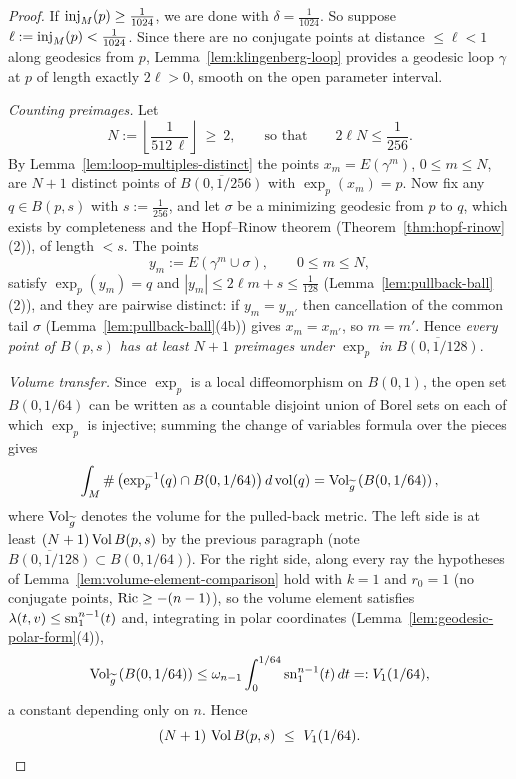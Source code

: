 \begin{proof}
If $\operatorname{inj}_M(p)\ge\tfrac{1}{1024}$, we are done with
$\delta=\tfrac1{1024}$. So suppose
$\ell:=\operatorname{inj}_M(p)<\tfrac1{1024}$. Since there are no conjugate
points at distance $\le\ell<1$ along geodesics from $p$,
Lemma~\ref{lem:klingenberg-loop} provides a geodesic loop $\gamma$
at $p$ of length exactly $2\ell>0$, smooth on the open parameter
interval.

\emph{Counting preimages.} Let
$$N:=\left\lfloor\frac{1}{512\,\ell}\right\rfloor\ \ge\ 2,
\qquad\text{so that}\qquad 2\ell N\le\frac{1}{256}.$$
By Lemma~\ref{lem:loop-multiples-distinct} the points
$x_m=E(\gamma^m)$, $0\le m\le N$, are $N+1$ distinct points of
$\overline{B(0,1/256)}$ with $\exp_p(x_m)=p$. Now fix any
$q\in B(p,s)$ with $s:=\tfrac1{256}$, and let $\sigma$ be a
minimizing geodesic from $p$ to $q$, which exists by completeness
and the Hopf--Rinow theorem (Theorem~\ref{thm:hopf-rinow}(2)),
of length $<s$. The points
$$y_m:=E\left(\gamma^m\cup\sigma\right),\qquad 0\le m\le N,$$
satisfy $\exp_p(y_m)=q$ and $|y_m|\le2\ell m+s\le\tfrac1{128}$
(Lemma~\ref{lem:pullback-ball}(2)), and they are pairwise
distinct: if $y_m=y_{m'}$ then cancellation of the common tail
$\sigma$ (Lemma~\ref{lem:pullback-ball}(4b)) gives
$x_m=x_{m'}$, so $m=m'$. Hence \emph{every point of $B(p,s)$ has
at least $N+1$ preimages under $\exp_p$ in
$\overline{B(0,1/128)}$}.

\emph{Volume transfer.} Since $\exp_p$ is a local
diffeomorphism on $B(0,1)$, the open set $B(0,1/64)$ can be written
as a countable disjoint union of Borel sets on each of which
$\exp_p$ is injective; summing the change of variables formula
over the pieces gives
$$\int_M\#\left(\operatorname{exp}_p^{-1}(q)\cap
B(0,1/64)\right)d\operatorname{vol}(q)
=\operatorname{Vol}_{\widetilde g}\left(B(0,1/64)\right),$$
where $\operatorname{Vol}_{\widetilde g}$ denotes the volume for the pulled-back
metric. The left side is at least $(N+1)\operatorname{Vol} B(p,s)$ by the
previous paragraph (note $\overline{B(0,1/128)}\subset B(0,1/64)$).
For the right side, along every ray the hypotheses of
Lemma~\ref{lem:volume-element-comparison} hold with $k=1$ and
$r_0=1$ (no conjugate points, $\operatorname{Ric}\ge-(n-1)$), so the volume
element satisfies $\lambda(t,v)\le\operatorname{sn}_1^{n-1}(t)$ and, integrating
in polar coordinates (Lemma~\ref{lem:geodesic-polar-form}(4)),
$$\operatorname{Vol}_{\widetilde g}\left(B(0,1/64)\right)
\le\omega_{n-1}\int_0^{1/64}\operatorname{sn}_1^{n-1}(t)\,dt=:V_1(1/64),$$
a constant depending only on $n$. Hence
\begin{equation}\label{volinjcount}
(N+1)\,\operatorname{Vol} B(p,s)\ \le\ V_1(1/64).
\end{equation}


\end{proof}
